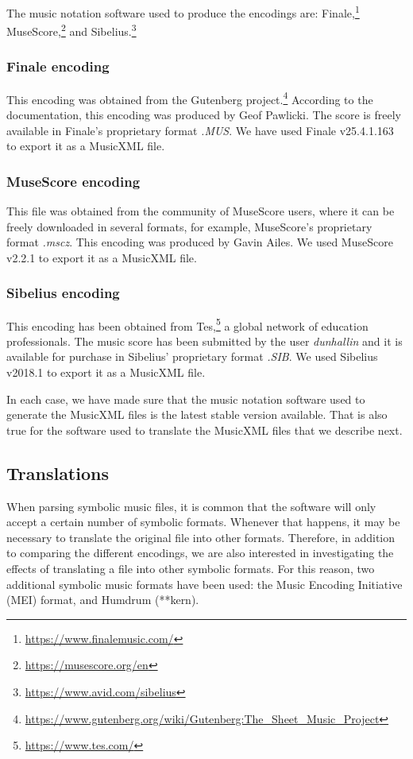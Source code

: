 The music notation software used to produce the encodings are: Finale,\footnote{\url{https://www.finalemusic.com/}} MuseScore,\footnote{\url{https://musescore.org/en}} and Sibelius.\footnote{\url{https://www.avid.com/sibelius}}

\subsubsection{Finale encoding}
This encoding was obtained from the Gutenberg project.\footnote{\url{https://www.gutenberg.org/wiki/Gutenberg:The_Sheet_Music_Project}} According to the documentation, this encoding was produced by Geof Pawlicki. The score is freely available in Finale's proprietary format \emph{.MUS}. We have used Finale v25.4.1.163 to export it as a MusicXML file.

\subsubsection{MuseScore encoding}
This file was obtained from the community of MuseScore users, where it can be freely downloaded in several formats, for example, MuseScore's proprietary format \emph{.mscz}. This encoding was produced by Gavin Ailes. We used MuseScore v2.2.1 to export it as a MusicXML file.

\subsubsection{Sibelius encoding}
This encoding has been obtained from Tes,\footnote{\url{https://www.tes.com/}} a global network of education professionals. The music score has been submitted by the user \emph{dunhallin} and it is available for purchase in Sibelius' proprietary format \emph{.SIB}. We used Sibelius v2018.1 to export it as a MusicXML file.

In each case, we have made sure that the music notation software used to generate the MusicXML files is the latest stable version available. That is also true for the software used to translate the MusicXML files that we describe next.

\subsection{Translations}
When parsing symbolic music files, it is common that the software will only accept a certain number of symbolic formats. Whenever that happens, it may be necessary to translate the original file into other formats. Therefore, in addition to comparing the different encodings, we are also interested in investigating the effects of translating a file into other symbolic formats. For this reason, two additional symbolic music formats have been used: the Music Encoding Initiative (MEI) format, and Humdrum (**kern).

